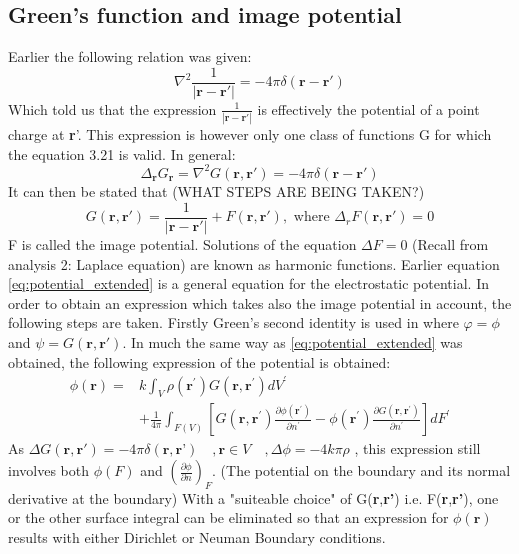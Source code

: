 \subsection{Green's function and image potential}
Earlier the following relation was given:
\begin{equation}
    \nabla^2 \frac{1}{|\textbf{r}-\textbf{r}'|} = -4\pi \delta(\textbf{r}-\textbf{r}')
\end{equation}
Which told us that the expression $\displaystyle \frac{1}{|\textbf{r}-\textbf{r}'|}$ is effectively the potential of a point charge at \textbf{r}'.
This expression is however only one class of functions G for which the equation 3.21 is valid. In general:
\begin{equation}
    \Delta_{\textbf{r}} G_{\textbf{r}} = \nabla ^2 G(\textbf{r},\textbf{r}') = -4\pi \delta(\textbf{r}- \textbf{r}')
\end{equation}
It can then be stated that (WHAT STEPS ARE BEING TAKEN?)
\begin{equation}
    G(\textbf{r},\textbf{r}') = \frac{1}{|\textbf{r}-\textbf{r}'|} + F(\textbf{r},\textbf{r}'), \text{ where } \Delta_r F(\textbf{r},\textbf{r}') = 0
\end{equation}
F is called the image potential. Solutions of the equation $\displaystyle \Delta F = 0$ (Recall from analysis 2: Laplace equation) are known as harmonic functions. 
Earlier equation \ref{eq:potential_extended} is a general equation for the electrostatic potential. In order to obtain an expression which takes also the image potential in account, the following steps are taken.
Firstly Green's second identity is used in where $\varphi = \phi$ and $\psi = G(\textbf{r},\textbf{r}')$. 
In much the same way as \ref{eq:potential_extended} was obtained, the following expression of the potential is obtained:
\begin{equation}
    \begin{aligned}
    \phi(\mathbf{r})=& k \int_{V} \rho\left(\mathbf{r}^{\prime}\right) G\left(\mathbf{r}, \mathbf{r}^{\prime}\right) d V^{\prime} \\
    &+\frac{1}{4 \pi} \int_{F(V)}\left[G\left(\mathbf{r}, \mathbf{r}^{\prime}\right) \frac{\partial \phi\left(\mathbf{r}^{\prime}\right)}{\partial n^{\prime}}-\phi\left(\mathbf{r}^{\prime}\right) \frac{\partial G\left(\mathbf{r}, \mathbf{r}^{\prime}\right)}{\partial n^{\prime}}\right] d F^{\prime}
    \end{aligned}
\end{equation}
As $\Delta G(\textbf{r},\textbf{r}') = -4\pi \delta( \textbf{r},\textbf{r'} ) \quad , \textbf{r} \in V \quad , \Delta \phi = -4k\pi \rho $ , this expression still involves both $\phi(F)$ and $\displaystyle \left(\frac{\partial \phi}{\partial n} \right)_F$. (The potential on the boundary and its normal derivative at the boundary)
With a "suiteable choice" of G(\textbf{r},\textbf{r'}) i.e. F(\textbf{r},\textbf{r'}), one or the other surface integral can be eliminated so that an expression for $\phi(\textbf{r})$ results with either Dirichlet or Neuman Boundary conditions. \\

